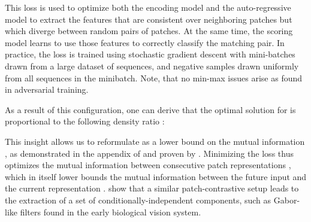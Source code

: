 \documentclass{article}
\begin{document}
This loss is used to optimize both the encoding model  and the auto-regressive model  to extract the features that are consistent over neighboring patches but which diverge between random pairs of patches. At the same time, the scoring model  learns to use those features to correctly classify the matching pair. In practice, the loss is trained using stochastic gradient descent with mini-batches drawn from a large dataset of sequences, and negative samples drawn uniformly from all sequences in the minibatch. Note, that no min-max issues arise as found in adversarial training.

As a result of this configuration, one can derive that the optimal solution for  is proportional to the following density ratio \citep{oord2018representation}:

This insight allows us to reformulate  as a lower bound on the mutual information , as demonstrated in the appendix of \citet{oord2018representation} and proven by \citet{poolevariational}. Minimizing the loss  thus optimizes the mutual information between consecutive patch representations , which in itself lower bounds the mutual information  between the future input  and the current representation . \cite{hyvarinen2016unsupervised} show that a similar patch-contrastive setup leads to the extraction of a set of conditionally-independent components, such as Gabor-like filters found in the early biological vision system.
\end{document}
